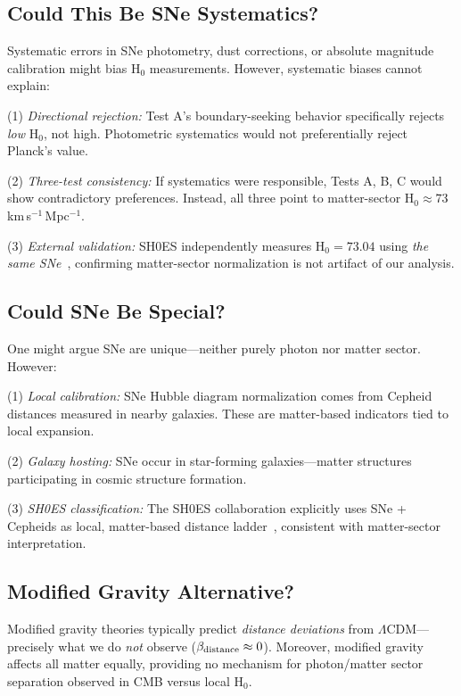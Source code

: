 \documentclass[twocolumn,superscriptaddress,prd,amsmath,amssymb]{revtex4-2}
\begin{document}
\subsection{Could This Be SNe Systematics?}

Systematic errors in SNe photometry, dust corrections, or absolute magnitude calibration might bias H$_0$ measurements. However, systematic biases cannot explain:

(1) \textit{Directional rejection:} Test A's boundary-seeking behavior specifically rejects \textit{low} H$_0$, not high. Photometric systematics would not preferentially reject Planck's value.

(2) \textit{Three-test consistency:} If systematics were responsible, Tests A, B, C would show contradictory preferences. Instead, all three point to matter-sector H$_0 \approx 73$ km\,s$^{-1}$\,Mpc$^{-1}$.

(3) \textit{External validation:} SH0ES independently measures H$_0 = 73.04$ using \textit{the same SNe}~\cite{Riess2022}, confirming matter-sector normalization is not artifact of our analysis.

\subsection{Could SNe Be Special?}

One might argue SNe are unique---neither purely photon nor matter sector. However:

(1) \textit{Local calibration:} SNe Hubble diagram normalization comes from Cepheid distances measured in nearby galaxies. These are matter-based indicators tied to local expansion.

(2) \textit{Galaxy hosting:} SNe occur in star-forming galaxies---matter structures participating in cosmic structure formation.

(3) \textit{SH0ES classification:} The SH0ES collaboration explicitly uses SNe + Cepheids as local, matter-based distance ladder~\cite{Riess2022}, consistent with matter-sector interpretation.

\subsection{Modified Gravity Alternative?}

Modified gravity theories typically predict \textit{distance deviations} from $\Lambda$CDM---precisely what we do \textit{not} observe ($\beta_{\rm distance} \approx 0$). Moreover, modified gravity affects all matter equally, providing no mechanism for photon/matter sector separation observed in CMB versus local H$_0$.
\end{document}
